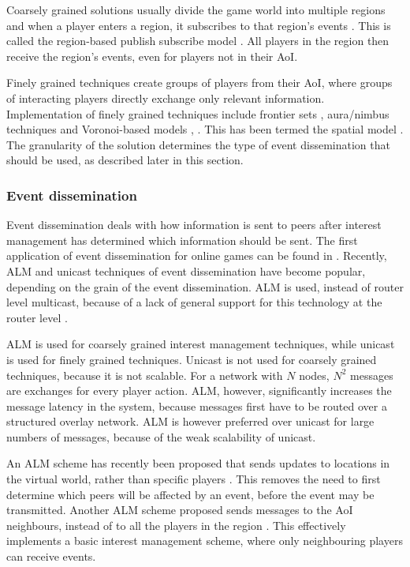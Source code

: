 \documentclass[10pt,a4paper,journal,cspaper,compsoc]{IEEEtran}
\begin{document}
Coarsely grained solutions usually divide the game world into multiple regions and when a player enters a region, it subscribes to that region's
events \cite{mercury_publish_subscribe}. This is called the region-based publish subscribe model \cite{Fan_deisgn_issues_p2p}. All players in the
region then receive the region's events, even for players not in their AoI.

Finely grained techniques create groups of players from their AoI, where groups of interacting players directly exchange only relevant information.
Implementation of finely grained techniques include frontier sets \cite{IM_frontier_sets}, aura/nimbus techniques \cite{Benford_spatial_IM} and
Voronoi-based models \cite{Hu_voronoi_IM}, \cite{Buyukkaya_voronoi_state_management}. This has been termed the spatial model
\cite{Fan_deisgn_issues_p2p}. The granularity of the solution determines the type of event dissemination that should be used, as described later in
this section.

\subsubsection{Event dissemination}

Event dissemination deals with how information is sent to peers after interest management has determined which information should be sent. The first
application of event dissemination for online games can be found in \cite{first_GED}. Recently, ALM and unicast techniques of event dissemination
have become popular, depending on the grain of the event dissemination. ALM is used, instead of router level multicast, because of a lack of general
support for this technology at the router level \cite{ip_multicast_deployment_issues}.

ALM is used for coarsely grained interest management techniques, while unicast is used for finely grained techniques. Unicast is not used for
coarsely grained techniques, because it is not scalable. For a network with $N$ nodes, $N^2$ messages are exchanges for every player action. ALM,
however, significantly increases the message latency in the system, because messages first have to be routed over a structured overlay network. ALM
is however preferred over unicast for large numbers of messages, because of the weak scalability of unicast.

An ALM scheme has recently been proposed that sends updates to locations in the virtual world, rather than specific players
\cite{Ghaffari_Delaunay_churn_mobility}. This removes the need to first determine which peers will be affected by an event, before the event may be
transmitted. Another ALM scheme proposed sends messages to the AoI neighbours, instead of to all the players in the region
\cite{Seeger_area_based_gossip_multicast}. This effectively implements a basic interest management scheme, where only neighbouring players can
receive events.
\end{document}
